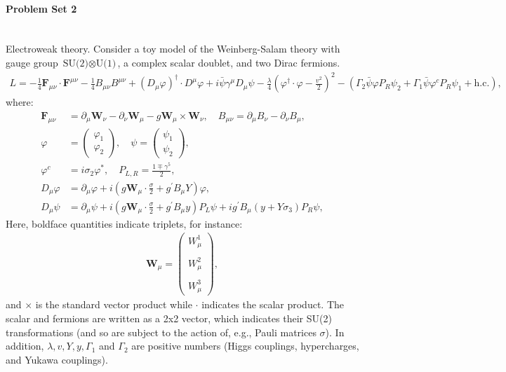 \paragraph*{Problem Set 2} %
\\
Electroweak theory. Consider a toy model of the Weinberg-Salam theory with gauge group $\text{SU(2)} \otimes \text{U(1)}$, a complex scalar doublet, and two Dirac fermions.
\begin{align}
    L = - \frac{1}{4} \mathbf{F}_{\mu\nu} \cdot \mathbf{F}^{\mu\nu} - \frac{1}{4} B_{\mu\nu}B^{\mu\nu} + (D_\mu \varphi)^\dagger \cdot D^\mu \varphi + i \bar{\psi} \gamma^\mu D_\mu \psi - \frac{\lambda}{4} \left( \varphi^\dagger \cdot \varphi - \frac{v^2}{2} \right)^2 - \left( \Gamma_2 \bar{\psi} \varphi P_R \psi_2 + \Gamma_1 \bar{\psi} \varphi^c P_R \psi_1 + \text{h.c.} \right), 
\end{align}
where:
\begin{align}
    \mathbf{F}_{\mu\nu} &= \partial_\mu \mathbf{W}_\nu - \partial_\nu \mathbf{W}_\mu - g \mathbf{W}_\mu \times \mathbf{W}_\nu , \quad B_{\mu\nu} = \partial_\mu B_\nu - \partial_\nu B_\mu, \\
    \varphi &= \begin{pmatrix} \varphi_1 \\ \varphi_2 \end{pmatrix}, \quad \psi = \begin{pmatrix} \psi_1 \\ \psi_2 \end{pmatrix}, \\
    \varphi^c &= i\sigma_2 \varphi^*, \quad P_{L,R} = \frac{1 \mp \gamma^5}{2}, \\
    D_\mu \varphi &= \partial_\mu \varphi + i \left( g \mathbf{W}_\mu \cdot \frac{\sigma}{2} + g^\prime B_\mu Y \right) \varphi, \\
    D_\mu \psi &= \partial_\mu \psi + i \left( g \mathbf{W}_\mu \cdot \frac{\sigma}{2} + g^\prime B_\mu y \right) P_L \psi + ig^\prime B_\mu (y + Y \sigma_3) P_R \psi,
\end{align}
Here, boldface quantities indicate triplets, for instance:
\begin{align}
    \mathbf{W}_\mu = \begin{pmatrix} W_\mu^1 \\\\ W_\mu^2 \\\\ W_\mu^3 \end{pmatrix},
\end{align}
and $\times$ is the standard vector product while $\cdot$ indicates the scalar product. The scalar and fermions are written as a 2x2 vector, which indicates their SU(2) transformations (and so are subject to the action of, e.g., Pauli matrices $\sigma$). In addition, $\lambda, v, Y, y, \Gamma_1$ and $\Gamma_2$ are positive numbers (Higgs couplings, hypercharges, and Yukawa couplings).

